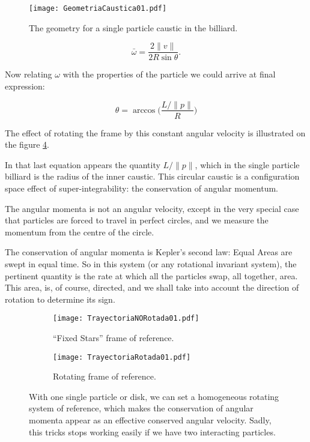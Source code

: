 \documentclass[letterpaperr,12pt]{article}
\begin{document}
\begin{figure}
\centering
\texttt{[image: GeometriaCaustica01.pdf]}
\caption{The geometry for  a single particle caustic in
the billiard.} \label{geocaustica01}
\end{figure}

\begin{equation}
  \bar{\omega}=\frac{2 \|v\| } { 2 R \sin \theta}.
\end{equation}

Now relating $\omega$ with the properties of the particle we 
could arrive at final expression:

\begin{equation}
\theta=\arccos \Big(\frac{L/\|p\|}{R}\Big)
\end{equation}

The effect of rotating the frame
by this constant angular velocity is illustrated on the figure
\ref{effectiveomega}.

In that last equation appears the quantity $L/\|p\|$, which
in the single particle billiard is the radius of the inner caustic.
This circular caustic is a configuration space effect of
super-integrability:
the conservation of angular momentum.
 
The angular momenta is not an angular velocity, except 
in the very special case that particles are forced to travel 
in perfect circles, and we measure the momentum from the 
centre of the circle.

The conservation of angular momenta is Kepler's second law:
Equal Areas are swept in equal time. So in this system
(or any rotational invariant system), the pertinent
quantity is the rate at which all the particles 
swap, all together, area. This area, is, of course,
directed, and we shall take into account the direction
of rotation to determine its sign. 

\begin{figure}[h]
  \centering
  \begin{subfigure}[b]{0.48\textwidth}
    \centering
    \texttt{[image: TrayectoriaNORotada01.pdf]}
    \caption{``Fixed Stars'' frame of reference.}
    \label{fixedtray01}
  \end{subfigure}%
\begin{subfigure}[b]{0.48\textwidth}
    \centering
          \texttt{[image: TrayectoriaRotada01.pdf]}
                \caption{Rotating frame of reference.}
                \label{ftigre01}
  \end{subfigure}
\caption{ With one single particle or disk, we can set a 
homogeneous rotating system of reference, which makes 
the conservation of angular momenta appear as an
effective conserved angular velocity. Sadly, this tricks
stops working easily if we have two interacting particles.
 }\label{effectiveomega}
\end{figure}
\end{document}
